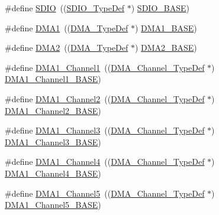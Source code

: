\begin{DoxyCompactItemize}
\#define \hyperlink{group___peripheral__declaration_ga8149aa2760fffac16bc75216d5fd9331}{S\+D\+IO}~((\hyperlink{struct_s_d_i_o___type_def}{S\+D\+I\+O\+\_\+\+Type\+Def} $\ast$) \hyperlink{group___peripheral__memory__map_ga95dd0abbc6767893b4b02935fa846f52}{S\+D\+I\+O\+\_\+\+B\+A\+SE})
\item 
\#define \hyperlink{group___peripheral__declaration_gacc16d2a5937f7585320a98f7f6b578f9}{D\+M\+A1}~((\hyperlink{struct_d_m_a___type_def}{D\+M\+A\+\_\+\+Type\+Def} $\ast$) \hyperlink{group___peripheral__memory__map_gab2d8a917a0e4ea99a22ac6ebf279bc72}{D\+M\+A1\+\_\+\+B\+A\+SE})
\item 
\#define \hyperlink{group___peripheral__declaration_ga506520140eec1708bc7570c49bdf972d}{D\+M\+A2}~((\hyperlink{struct_d_m_a___type_def}{D\+M\+A\+\_\+\+Type\+Def} $\ast$) \hyperlink{group___peripheral__memory__map_gab72a9ae145053ee13d1d491fb5c1df64}{D\+M\+A2\+\_\+\+B\+A\+SE})
\item 
\#define \hyperlink{group___peripheral__declaration_gac83c5be824be1c02716e2522e80ddf7a}{D\+M\+A1\+\_\+\+Channel1}~((\hyperlink{struct_d_m_a___channel___type_def}{D\+M\+A\+\_\+\+Channel\+\_\+\+Type\+Def} $\ast$) \hyperlink{group___peripheral__memory__map_ga888dbc1608243badeb3554ffedc7364c}{D\+M\+A1\+\_\+\+Channel1\+\_\+\+B\+A\+SE})
\item 
\#define \hyperlink{group___peripheral__declaration_ga23d7631dd10c645e06971b2543ba2949}{D\+M\+A1\+\_\+\+Channel2}~((\hyperlink{struct_d_m_a___channel___type_def}{D\+M\+A\+\_\+\+Channel\+\_\+\+Type\+Def} $\ast$) \hyperlink{group___peripheral__memory__map_ga38a70090eef3687e83fa6ac0c6d22267}{D\+M\+A1\+\_\+\+Channel2\+\_\+\+B\+A\+SE})
\item 
\#define \hyperlink{group___peripheral__declaration_gacf7b6093a37b306d7f1f50b2f200f0d0}{D\+M\+A1\+\_\+\+Channel3}~((\hyperlink{struct_d_m_a___channel___type_def}{D\+M\+A\+\_\+\+Channel\+\_\+\+Type\+Def} $\ast$) \hyperlink{group___peripheral__memory__map_ga70b3d9f36ca9ce95b4e421c11154fe5d}{D\+M\+A1\+\_\+\+Channel3\+\_\+\+B\+A\+SE})
\item 
\#define \hyperlink{group___peripheral__declaration_gad2c42743316bf64da557130061b1f56a}{D\+M\+A1\+\_\+\+Channel4}~((\hyperlink{struct_d_m_a___channel___type_def}{D\+M\+A\+\_\+\+Channel\+\_\+\+Type\+Def} $\ast$) \hyperlink{group___peripheral__memory__map_ga1adc93cd0baf0897202c71110e045692}{D\+M\+A1\+\_\+\+Channel4\+\_\+\+B\+A\+SE})
\item 
\#define \hyperlink{group___peripheral__declaration_ga06ff98ddef3c962795d2e2444004abff}{D\+M\+A1\+\_\+\+Channel5}~((\hyperlink{struct_d_m_a___channel___type_def}{D\+M\+A\+\_\+\+Channel\+\_\+\+Type\+Def} $\ast$) \hyperlink{group___peripheral__memory__map_gac041a71cd6c1973964f847a68aa14478}{D\+M\+A1\+\_\+\+Channel5\+\_\+\+B\+A\+SE})

\end{DoxyCompactItemize}
